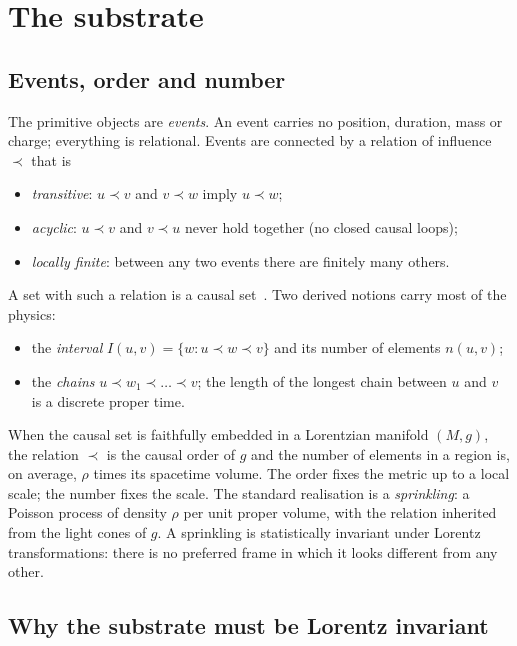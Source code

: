 \section{The substrate}\label{sec:substrate}

\subsection{Events, order and number}

The primitive objects are \emph{events}. An event carries no position, duration, mass or charge;
everything is relational. Events are connected by a relation of influence $\prec$ that is
\begin{itemize}
\item \emph{transitive}: $u\prec v$ and $v\prec w$ imply $u\prec w$;
\item \emph{acyclic}: $u\prec v$ and $v\prec u$ never hold together (no closed causal loops);
\item \emph{locally finite}: between any two events there are finitely many others.
\end{itemize}
A set with such a relation is a causal set~\cite{Bombelli1987,Surya2019}. Two derived notions carry
most of the physics:
\begin{itemize}
\item the \emph{interval} $I(u,v)=\{w: u\prec w\prec v\}$ and its number of elements $n(u,v)$;
\item the \emph{chains} $u\prec w_1\prec\dots\prec v$; the length of the longest chain between $u$ and
  $v$ is a discrete proper time.
\end{itemize}

When the causal set is faithfully embedded in a Lorentzian manifold $(M,g)$, the relation $\prec$ is
the causal order of $g$ and the number of elements in a region is, on average, $\rho$ times its
spacetime volume. The order fixes the metric up to a local scale; the number fixes the scale.
The standard realisation is a \emph{sprinkling}: a Poisson process of density $\rho$ per unit proper
volume, with the relation inherited from the light cones of $g$. A sprinkling is statistically
invariant under Lorentz transformations: there is no preferred frame in which it looks different
from any other.

\subsection{Why the substrate must be Lorentz invariant}\label{sec:why-lorentz}

